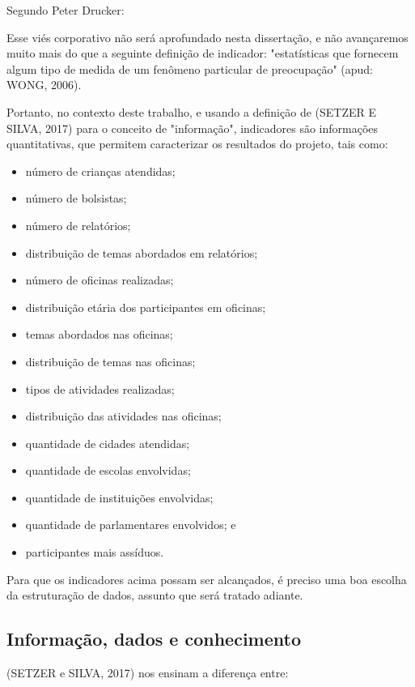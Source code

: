 Segundo Peter Drucker:


\noindent\begin{flushright}\mbox{\linespread{1}\selectfont\centering{}}\end{flushright}


Esse viés corporativo não será aprofundado nesta dissertação, e não avançaremos muito mais do que a seguinte definição de indicador: "estatísticas que fornecem algum tipo de medida de um fenômeno particular de preocupação" (apud: WONG, 2006).

Portanto, no contexto deste trabalho, e usando a definição de (SETZER E SILVA, 2017) para o conceito de "informação", indicadores são informações quantitativas, que permitem caracterizar os resultados do projeto, tais como:


\begin{itemize}
\item número de crianças atendidas;
\item número de bolsistas;
\item número de relatórios;
\item distribuição de temas abordados em relatórios;
\item número de oficinas realizadas;
\item distribuição etária dos participantes em oficinas;
\item temas abordados nas oficinas;
\item distribuição de temas nas oficinas;
\item tipos de atividades realizadas;
\item distribuição das atividades nas oficinas;
\item quantidade de cidades atendidas;
\item quantidade de escolas envolvidas;
\item quantidade de instituições envolvidas;
\item quantidade de parlamentares envolvidos; e
\item participantes mais assíduos.
\end{itemize}

Para que os indicadores acima possam ser alcançados, é preciso uma boa escolha da estruturação de dados, assunto que será tratado adiante.

\subsection[Informação, dados e conhecimento]{Informação, dados e conhecimento}\label{Informação, dados e conhecimento}
(SETZER e SILVA, 2017)  nos ensinam a diferença entre:


